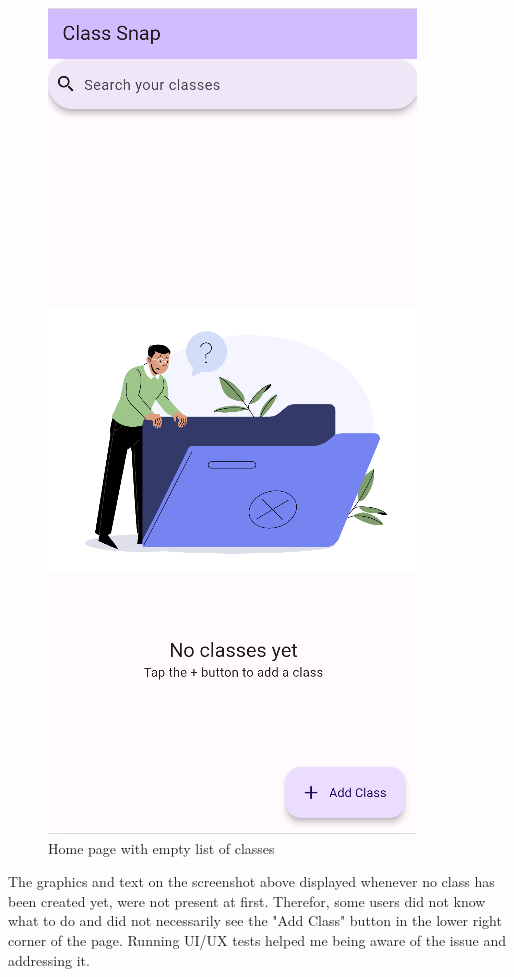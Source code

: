 \documentclass[]{article}
\begin{document}
	\begin{figure}[!htb]
		\centering
		\includegraphics[scale=0.4]{ui_improve_class_list}
		\caption{Home page with empty list of classes}
	\end{figure}
	
	The graphics and text on the screenshot above displayed whenever no class has been created yet, were not present at first.\linebreak
	Therefor, some users did not know what to do and did not necessarily see the "Add Class" button in the lower right corner of the page.\linebreak
	Running UI/UX tests helped me being aware of the issue and addressing it.
	
\end{document}

